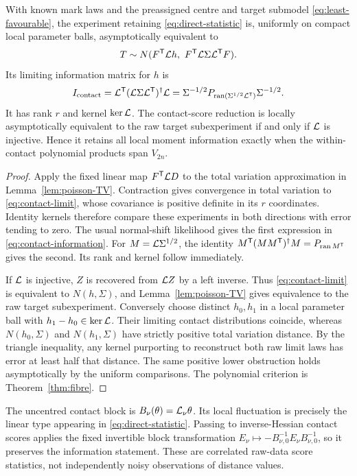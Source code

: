 \begin{theorem}\label{thm:contact-experiment}
With known mark laws and the preassigned centre and target submodel \eqref{eq:least-favourable}, the experiment retaining \eqref{eq:direct-statistic} is, uniformly on compact local parameter balls, asymptotically equivalent to
\begin{equation}\label{eq:contact-limit}
 T\sim N(F^{\mathsf T}\mathcal L h,\ F^{\mathsf T}\mathcal L\Sigma\mathcal L^{\mathsf T}F).
\end{equation}
Its limiting information matrix for $h$ is
\begin{equation}\label{eq:contact-information}
 I_{\rm contact}=\mathcal L^{\mathsf T}(\mathcal L\Sigma\mathcal L^{\mathsf T})^\dagger\mathcal L
 =\Sigma^{-1/2}P_{\operatorname{ran}(\Sigma^{1/2}\mathcal L^{\mathsf T})}\Sigma^{-1/2}.
\end{equation}
It has rank $r$ and kernel $\ker\mathcal L$. The contact-score reduction is locally asymptotically equivalent to the raw target subexperiment if and only if $\mathcal L$ is injective. Hence it retains all local moment information exactly when the within-contact polynomial products span $V_{2n}$.
\end{theorem}
\begin{proof}
Apply the fixed linear map $F^{\mathsf T}\mathcal L D$ to the total variation approximation in Lemma~\ref{lem:poisson-TV}. Contraction gives convergence in total variation to \eqref{eq:contact-limit}, whose covariance is positive definite in its $r$ coordinates. Identity kernels therefore compare these experiments in both directions with error tending to zero. The usual normal-shift likelihood gives the first expression in \eqref{eq:contact-information}. For $M=\mathcal L\Sigma^{1/2}$, the identity $M^{\mathsf T}(MM^{\mathsf T})^\dagger M=P_{\operatorname{ran} M^{\mathsf T}}$ gives the second. Its rank and kernel follow immediately.

If $\mathcal L$ is injective, $Z$ is recovered from $\mathcal L Z$ by a left inverse. Thus \eqref{eq:contact-limit} is equivalent to $N(h,\Sigma)$, and Lemma~\ref{lem:poisson-TV} gives equivalence to the raw target subexperiment. Conversely choose distinct $h_0,h_1$ in a local parameter ball with $h_1-h_0\in\ker\mathcal L$. Their limiting contact distributions coincide, whereas $N(h_0,\Sigma)$ and $N(h_1,\Sigma)$ have strictly positive total variation distance. By the triangle inequality, any kernel purporting to reconstruct both raw limit laws has error at least half that distance. The same positive lower obstruction holds asymptotically by the uniform comparisons. The polynomial criterion is Theorem~\ref{thm:fibre}.
\end{proof}
The uncentred contact block is $B_\nu(\theta)=\mathcal L_\nu\theta$. Its local fluctuation is precisely the linear type appearing in \eqref{eq:direct-statistic}. Passing to inverse-Hessian contact scores applies the fixed invertible block transformation $E_\nu\mapsto-B_{\nu,0}^{-1}E_\nu B_{\nu,0}^{-1}$, so it preserves the information statement. These are correlated raw-data score statistics, not independently noisy observations of distance values.

